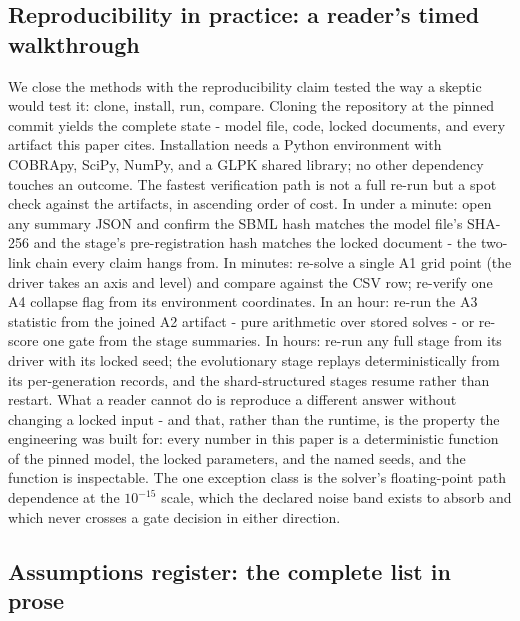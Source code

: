\documentclass[12pt]{article}
\begin{document}
\subsection{Reproducibility in practice: a reader's timed walkthrough}

We close the methods with the reproducibility claim tested the way a
skeptic would test it: clone, install, run, compare. Cloning the
repository at the pinned commit yields the complete state - model
file, code, locked documents, and every artifact this paper cites.
Installation needs a Python environment with COBRApy, SciPy, NumPy,
and a GLPK shared library; no other dependency touches an outcome.
The fastest verification path is not a full re-run but a spot check
against the artifacts, in ascending order of cost. In under a minute:
open any summary JSON and confirm the SBML hash matches the model
file's SHA-256 and the stage's pre-registration hash matches the
locked document - the two-link chain every claim hangs from. In
minutes: re-solve a single A1 grid point (the driver takes an axis
and level) and compare against the CSV row; re-verify one A4 collapse
flag from its environment coordinates. In an hour: re-run the A3
statistic from the joined A2 artifact - pure arithmetic over stored
solves - or re-score one gate from the stage summaries. In hours:
re-run any full stage from its driver with its locked seed; the
evolutionary stage replays deterministically from its per-generation
records, and the shard-structured stages resume rather than restart.
What a reader cannot do is reproduce a different answer without
changing a locked input - and that, rather than the runtime, is the
property the engineering was built for: every number in this paper
is a deterministic function of the pinned model, the locked
parameters, and the named seeds, and the function is inspectable.
The one exception class is the solver's floating-point path
dependence at the $10^{-15}$ scale, which the declared noise band
exists to absorb and which never crosses a gate decision in either
direction.

\subsection{Assumptions register: the complete list in prose}
\end{document}
